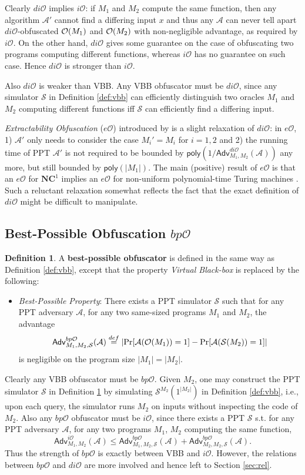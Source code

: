 \documentclass[12pt]{article}
\newcommand{\eqdef}{\stackrel{def}{=}}
\newcommand{\A}{\mathcal{A}}
\newcommand{\Sim}{\mathcal{S}}
\newcommand{\Adv}{\mathsf{Adv}}
\newcommand{\poly}{\mathsf{poly}}
\newcommand{\io}{i\mathcal{O}}
\newcommand{\dio}{di\mathcal{O}}
\newcommand{\bpo}{bp\mathcal{O}}
\theoremstyle{definition}
\newtheorem{definition}[theorem]{Definition}
\begin{document}
Clearly $\dio$ implies $\io$: if $M_1$ and $M_2$ compute the same function, then any algorithm $\A'$ cannot find a differing input $x$ and thus any $\A$ can never tell apart $\dio$-obfuscated $\mathcal{O}(M_1)$ and $\mathcal{O}(M_2)$ with non-negligible advantage, as required by $\io$.
On the other hand, $\dio$ gives some guarantee on the case of obfuscating two programs computing different functions, whereas $\io$ has no guarantee on such case. Hence $\dio$ is stronger than $\io$.

Also $\dio$ is weaker than VBB. Any VBB obfuscator must be $\dio$, since any simulator $\Sim$ in Definition \ref{def:vbb} can efficiently distinguish two oracles $M_1$ and $M_2$ computing different functions iff $\Sim$ can efficiently find a differing input.

\newcommand{\eO}{e\mathcal{O}}
\label{sec:eo}
\emph{Extractability Obfuscation} ($\eO$) introduced by \cite{boyle2014extractability} is a slight relaxation of $\dio$: in $\eO$, 1) $\A'$ only needs to consider the case $M_i' = M_i$ for $i=1,2$ and 2) the running time of PPT $\A'$ is not required to be bounded by $\poly(1/\Adv_{M_1,M_2}^{\dio}(\A))$ any more, but still bounded by $\poly(|M_1|)$. The main (positive) result of $\eO$ is that an $\eO$ for $\mathbf{NC}^1$ implies an $\eO$ for non-uniform polynomial-time Turing machines \cite{boyle2014extractability}. Such a reluctant relaxation somewhat reflects the fact that the exact definition of $\dio$ might be difficult to manipulate.

\subsection{Best-Possible Obfuscation $\bpo$}
\begin{definition}
\label{def:bp}
A {\bf best-possible obfuscator} is defined in the same way as Definition \ref{def:vbb}, except that the property \emph{Virtual Black-box} is replaced by the following:
\begin{itemize}
\item \emph{Best-Possible Property}: There exists a PPT simulator $\Sim$ such that for any PPT adversary $\A$, for any two same-sized programs $M_1$ and $M_2$, the advantage 
$$\Adv_{M_1,M_2,\Sim}^{\bpo}(\A) \eqdef \left| \Pr[\A(\bigoh(M_1)) = 1] - \Pr[\A(\Sim(M_2)) = 1] \right|$$
is negligible on the program size $|M_1| = |M_2|$.
\end{itemize}
\end{definition}
Clearly any VBB obfuscator must be $\bpo$. Given $M_2$, one may construct the PPT simulator $\Sim$ in Definition \ref{def:bp} by simulating $\Sim^{M_2}(1^{|M_2|})$ in Definition \ref{def:vbb}, i.e., upon each query, the simulator runs $M_2$ on inputs without inspecting the code of $M_2$. Also any $\bpo$ obfuscator must be $\io$, since there exists a PPT $\Sim$ s.t. for any PPT adversary $\A$, for any two programs $M_1$, $M_2$ computing the same function,
$$\Adv_{M_1,M_2}^{\io}(\A) \leq \Adv_{M_1,M_2,\Sim}^{\bpo}(\A) + \Adv_{M_2,M_2,\Sim}^{\bpo}(\A).$$ 
Thus the strength of $\bpo$ is exactly between VBB and $\io$. However, the relations between $\bpo$ and $\dio$ are more involved and hence left to Section \ref{sec:rel}.
\end{document}

